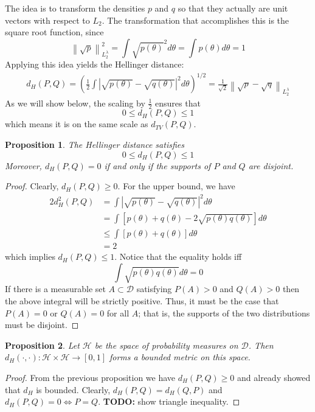 \documentclass[12pt]{article}
\newcommand*{\norm}[1]{\left\lVert#1\right\rVert}
\newcommand*{\abs}[1]{\left\lvert#1\right\rvert}
\newtheorem{prop}{Proposition}
\begin{document}
The idea is to transform the densities $p$ and $q$ so that they actually are unit vectors with respect to $L_2$. The transformation that accomplishes this is the square root function, since 
\[\norm{\sqrt{p}}^2_{L_2^\lambda} = \int \sqrt{p(\theta)}^2 d\theta =  \int p(\theta) d\theta = 1 \]
Applying this idea yields the Hellinger distance:
\begin{align}
d_H(P, Q) = \left(\frac{1}{2} \int \abs{\sqrt{p(\theta)} - \sqrt{q(\theta)}}^2 d\theta \right)^{1/2} = \frac{1}{\sqrt{2}} \norm{\sqrt{p} - \sqrt{q}}_{L_2^\lambda}
\end{align} 
As we will show below, the scaling by $\frac{1}{2}$ ensures that 
\[0 \leq d_H(P, Q) \leq 1\]
which means it is on the same scale as $d_{TV}(P, Q)$. 

\begin{prop}
The Hellinger distance satisfies 
\[0 \leq d_H(P, Q) \leq 1\]
Moreover,  $d_H(P, Q) = 0$ if and only if the supports of $P$ and $Q$ are disjoint.  
\end{prop}

\begin{proof}
Clearly, $d_H(P, Q) \geq 0$. For the upper bound, we have 
\begin{align*}
2d^2_H(P, Q) &= \int \abs{\sqrt{p(\theta)} - \sqrt{q(\theta)}}^2 d\theta \\
		      &= \int \left[ p(\theta) + q(\theta) - 2\sqrt{p(\theta) q(\theta)} \right] d\theta \\
		      &\leq \int \left[ p(\theta) + q(\theta) \right] d\theta \\
		      &= 2
\end{align*} 
which implies $d_H(P, Q) \leq 1$. Notice that the equality holds iff
\[\int \sqrt{p(\theta) q(\theta)} d\theta = 0\]
If there is a measurable set $A \subset \mathcal{D}$ satisfying $P(A) > 0$ and $Q(A) > 0$ then the above integral will be strictly positive. 
Thus, it must be the case that $P(A) = 0$ or $Q(A) = 0$ for all $A$; that is, the supports of the two distributions must be disjoint. 
\end{proof}

\begin{prop} 
Let $\mathcal{H}$ be the space of probability measures on $\mathcal{D}$. Then $d_H(\cdot, \cdot): \mathcal{H} \times \mathcal{H} \to [0, 1]$ forms a bounded metric on this space. 
\end{prop}

\begin{proof}
From the previous proposition we have $d_H(P, Q) \geq 0$ and already showed that $d_H$ is bounded. Clearly, $d_H(P, Q) = d_H(Q, P)$ and 
$d_H(P, Q) = 0 \iff P = Q$. \textbf{TODO: } show triangle inequality. 
\end{proof}
\end{document}
